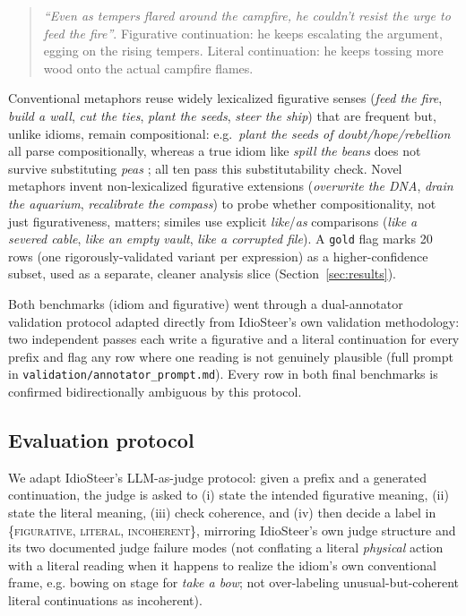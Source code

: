\documentclass[11pt]{article}
\begin{document}
\begin{quote}
\emph{``Even as tempers flared around the campfire, he couldn't resist the urge to feed
the fire''}. Figurative continuation: he keeps escalating the argument, egging on the
rising tempers. Literal continuation: he keeps tossing more wood onto the actual
campfire flames.
\end{quote}

Conventional metaphors reuse widely lexicalized figurative senses (\emph{feed the fire},
\emph{build a wall}, \emph{cut the ties}, \emph{plant the seeds}, \emph{steer the ship})
that are frequent but, unlike idioms, remain compositional: e.g.\ \emph{plant the seeds of
doubt/hope/rebellion} all parse compositionally, whereas a true idiom like \emph{spill the
beans} does not survive substituting \emph{peas} \citep{nunberg}; all ten pass this
substitutability check. Novel metaphors invent non-lexicalized figurative extensions
(\emph{overwrite the DNA}, \emph{drain the aquarium}, \emph{recalibrate the compass}) to
probe whether compositionality, not just figurativeness, matters; similes use explicit
\emph{like}/\emph{as} comparisons (\emph{like a severed cable}, \emph{like an empty
vault}, \emph{like a corrupted file}). A \texttt{gold} flag marks 20 rows (one
rigorously-validated variant per expression) as a higher-confidence subset, used as a
separate, cleaner analysis slice (Section~\ref{sec:results}).

Both benchmarks (idiom and figurative) went through a dual-annotator validation protocol
adapted directly from IdioSteer's own validation methodology: two independent passes
each write a figurative and a literal continuation for every prefix and flag any row
where one reading is not genuinely plausible (full prompt in
\texttt{validation/annotator\_prompt.md}). Every row in both final benchmarks is
confirmed bidirectionally ambiguous by this protocol.

\subsection{Evaluation protocol}

We adapt IdioSteer's LLM-as-judge protocol: given a prefix and a generated continuation,
the judge is asked to (i) state the intended figurative meaning, (ii) state the literal
meaning, (iii) check coherence, and (iv) then decide a label in
\{\textsc{figurative}, \textsc{literal}, \textsc{incoherent}\}, mirroring IdioSteer's
own judge structure and its two documented judge failure modes (not conflating a literal
\emph{physical} action with a literal reading when it happens to realize the idiom's own
conventional frame, e.g. bowing on stage for \emph{take a bow}; not over-labeling
unusual-but-coherent literal continuations as incoherent).
\end{document}
